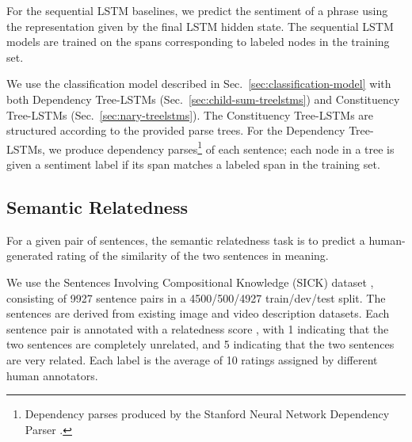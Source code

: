 \documentclass[11pt]{article}
\begin{document}
For the sequential LSTM baselines, we predict the sentiment of a phrase using the representation given by the final LSTM hidden state. The sequential LSTM models are trained on the spans corresponding to labeled nodes in the training set.

We use the classification model described in Sec.~\ref{sec:classification-model} with both Dependency Tree-LSTMs (Sec.~\ref{sec:child-sum-treelstms}) and Constituency Tree-LSTMs (Sec.~\ref{sec:nary-treelstms}). The Constituency Tree-LSTMs are structured according to the provided parse trees. For the Dependency Tree-LSTMs, we produce dependency parses\footnote{Dependency parses produced by the Stanford Neural Network Dependency Parser \citep{chen2014fast}.} of each sentence; each node in a tree is given a sentiment label if its span matches a labeled span in the training set. 

\begin{table}[t]
\caption{Memory dimensions  and composition function parameter counts  for each LSTM variant that we evaluate.}
\label{tab:parameter-counts}
\end{table}

\subsection{Semantic Relatedness}

For a given pair of sentences, the semantic relatedness task is to predict a human-generated rating of the similarity of the two sentences in meaning.

We use the Sentences Involving Compositional Knowledge (SICK) dataset \citep{marelli2014semeval}, consisting of 9927 sentence pairs in a 4500/500/4927 train/dev/test split. The sentences are derived from existing image and video description datasets. Each sentence pair is annotated with a relatedness score , with 1 indicating that the two sentences are completely unrelated, and 5 indicating that the two sentences are very related. Each label is the average of 10 ratings assigned by different human annotators.
\end{document}
